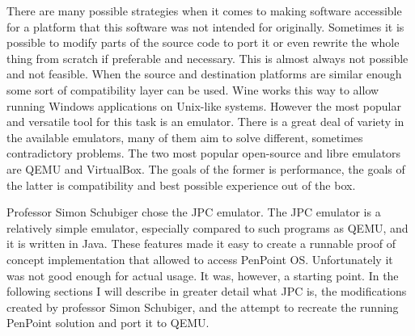 There are many possible strategies when it comes to making software accessible
for a platform that this software was not intended for originally.  Sometimes
it is possible to modify parts of the source code to port it or even rewrite
the whole thing from scratch if preferable and necessary.  This is almost
always not possible and not feasible.  When the source and destination
platforms are similar enough some sort of compatibility layer can be used.
Wine works this way to allow running Windows applications on Unix-like systems.
However the most popular and versatile tool for this task is an emulator.
There is a great deal of variety in the available emulators, many of them aim
to solve different, sometimes contradictory problems.  The two most popular
open-source and libre emulators are QEMU and VirtualBox.  The goals of the
former is performance, the goals of the latter is compatibility and best
possible experience out of the box.

Professor Simon Schubiger chose the JPC emulator.  The JPC emulator is
a relatively simple emulator, especially compared to such programs as QEMU, and
it is written in Java.  These features made it easy to create a runnable proof
of concept implementation that allowed to access PenPoint OS.  Unfortunately it
was not good enough for actual usage.  It was, however, a starting point.  In
the following sections I will describe in greater detail what JPC is, the
modifications created by professor Simon Schubiger, and the attempt to recreate
the running PenPoint solution and port it to QEMU.
